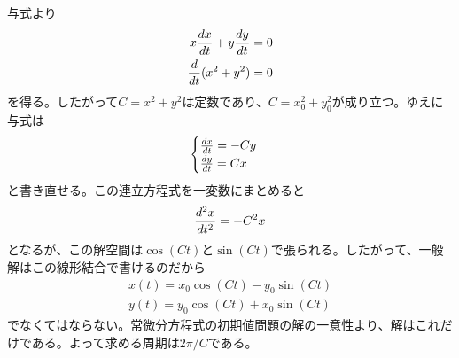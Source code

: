 \subsubsection{}
\begin{sol}
与式より
\begin{align*}
  x \frac{dx}{dt} + y \frac{dy}{dt} &= 0 \\
  \frac{d}{dt}(x^2 + y^2) &= 0
\end{align*}
を得る。したがって$C = x^2 + y^2$は定数であり、$C = x_0^2 + y_0^2$が成り立つ。ゆえに与式は
\[
\begin{cases}
  \frac{dx}{dt} = - Cy \\
    \frac{dy}{dt} = Cx
\end{cases}
\]
と書き直せる。この連立方程式を一変数にまとめると
\[
\frac{d^2 x}{dt^2} = - C^2 x
\]
となるが、この解空間は$\cos (C t)$と$\sin (Ct)$で張られる。したがって、一般解はこの線形結合で書けるのだから
\begin{align*}
  x(t) = x_0 \cos(Ct) - y_0 \sin (Ct) \\
  y(t) = y_0 \cos(Ct) + x_0 \sin (Ct)
\end{align*}
でなくてはならない。常微分方程式の初期値問題の解の一意性より、解はこれだけである。よって求める周期は$2\pi / C$である。
\end{sol}

\newpage


